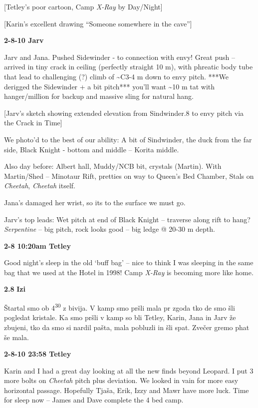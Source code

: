 {[}Tetley's poor cartoon, Camp \emph{X-Ray} by Day/Night{]}

{[}Karin's excellent drawing ``Someone somewhere in the cave''{]}

\textbf{2-8-10 Jarv}

Jarv and Jana. Pushed Sidewinder - to connection with envy! Great push
-- arrived in tiny crack in ceiling (perfectly straight 10 m), with
phreatic body tube that lead to challenging (?) climb of
\textasciitilde C3-4 m down to envy pitch. ***We derigged the Sidewinder
+ a bit pitch*** you'll want \textasciitilde 10 m tat with
hanger/million for backup and massive sling for natural hang.

{[}Jarv's sketch showing extended elevation from Sindwinder.8 to envy
pitch via the Crack in Time{]}

We photo'd to the best of our ability: A bit of Sindwinder, the duck
from the far side, Black Knight - bottom and middle -- Korita middle.

Also day before: Albert hall, Muddy/NCB bit, crystals (Martin). With
Martin/Shed -- Minotaur Rift, pretties on way to Queen's Bed Chamber,
Stals on \emph{Cheetah}, \emph{Cheetah} itself.

Jana's damaged her wrist, so its to the surface we must go.

Jarv's top leads: Wet pitch at end of Black Knight -- traverse along
rift to hang? \emph{Serpentine} -- big pitch, rock looks good -- big
ledge @ 20-30 m depth.

\textbf{2-8 10:20am Tetley}

Good night's sleep in the old `buff bag' -- nice to think I was sleeping
in the same bag that we used at the Hotel in 1998! Camp \emph{X-Ray} is
becoming more like home.

\textbf{2.8} \textbf{Izi}

Štartal smo ob 4\textsuperscript{30} z bivija. V kamp smo pršli mala pr
zgoda tko de smo šli pogledat kristale. Ka smo pršli v kamp so bli
Tetley, Karin, Jana in Jarv že zbujeni, tko da smo si nardil pašta, mala
pobluzli in šli spat. Zvečer gremo phat še mala.

\textbf{2-8-10 23:58 Tetley}

Karin and I had a great day looking at all the new finds beyond Leopard.
I put 3 more bolts on \emph{Cheetah} pitch plus deviation. We looked in
vain for more easy horizontal passage. Hopefully Tjaša, Erik, Izzy and
Mawr have more luck. Time for sleep now -- James and Dave complete the 4
bed camp.

